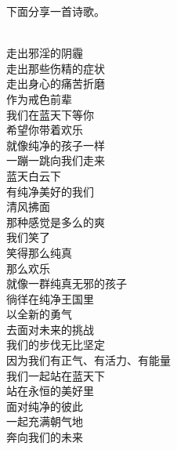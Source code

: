 下面分享一首诗歌。

\begin{poem}[我们在蓝天下等你]
    \begin{multicols}{2}
        \centering~\\
        走出邪淫的阴霾 \\ 走出那些伤精的症状 \\ 走出身心的痛苦折磨 \\ 作为戒色前辈 \\ 我们在蓝天下等你 \\ 希望你带着欢乐 \\ 就像纯净的孩子一样 \\ 一蹦一跳向我们走来 \\ 蓝天白云下 \\ 有纯净美好的我们 \\ 清风拂面 \\ 那种感觉是多么的爽 \\ 我们笑了 \\ 笑得那么纯真 \\ 那么欢乐 \\ 就像一群纯真无邪的孩子 \\ 徜徉在纯净王国里 \\ 以全新的勇气 \\ 去面对未来的挑战 \\ 我们的步伐无比坚定 \\ 因为我们有正气、有活力、有能量 \\ 我们一起站在蓝天下 \\ 站在永恒的美好里 \\ 面对纯净的彼此 \\ 一起充满朝气地 \\ 奔向我们的未来
    \end{multicols}
\end{poem}
